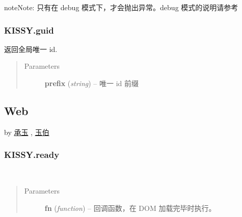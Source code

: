 \documentclass[letterpaper,10pt,english]{sphinxmanual}
\begin{document}
\begin{notice}{note}{Note:}
只有在 debug 模式下，才会抛出异常。debug 模式的说明请参考 {\hyperref[api/seed/kissy/Config:Seed.KISSY.Config]{}}
\end{notice}


\subsubsection{KISSY.guid}
\label{api/seed/kissy/guid::doc}\label{api/seed/kissy/guid:kissy-guid}

\begin{fulllineitems}
\label{api/seed/kissy/guid:Seed.KISSY.guid}
返回全局唯一 id.
\begin{quote}\begin{description}
\item[{Parameters}] \leavevmode
\textbf{prefix} (\emph{string}) -- 唯一 id 前缀

\end{description}\end{quote}

\end{fulllineitems}

\label{api/seed/web/index:module-Web}

\subsection{Web}
\label{api/seed/web/index:web}\label{api/seed/web/index::doc}
by \href{mailto:yiminghe@gmail.com}{承玉} , \href{mailto:lifesinger@gmail.com}{玉伯}


\subsubsection{KISSY.ready}
\label{api/seed/web/ready::doc}\label{api/seed/web/ready:kissy-ready}

\begin{fulllineitems}
\label{api/seed/web/ready:Web.KISSY.ready}~\begin{quote}\begin{description}
\item[{Parameters}] \leavevmode
\textbf{fn} (\emph{function}) -- 回调函数，在 DOM 加载完毕时执行。

\end{description}\end{quote}

\end{fulllineitems}
\end{document}
